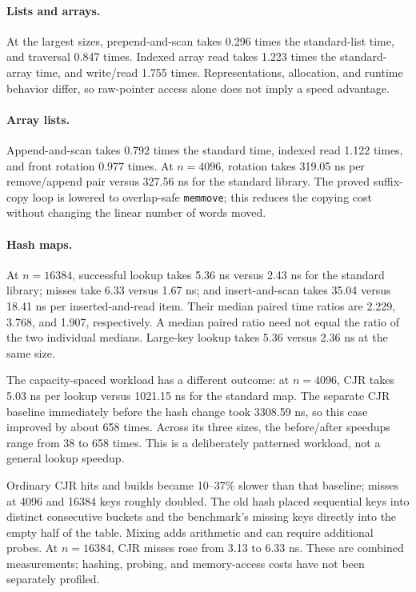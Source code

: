 \paragraph{Lists and arrays.} At the largest sizes, prepend-and-scan takes
0.296 times the standard-list time, and traversal 0.847 times.
Indexed array read takes 1.223 times the standard-array time, and
write/read 1.755 times. Representations, allocation, and runtime behavior
differ, so raw-pointer access alone does not imply a speed advantage.

\paragraph{Array lists.} Append-and-scan takes 0.792 times the standard
time, indexed read 1.122 times, and front rotation 0.977 times.
At $n=4096$, rotation takes 319.05 ns per remove/append pair versus
327.56 ns for the standard library. The proved suffix-copy loop is lowered
to overlap-safe \texttt{memmove}; this reduces the copying cost without
changing the linear number of words moved.

\paragraph{Hash maps.} At $n=16384$, successful lookup takes 5.36 ns
versus 2.43 ns for the standard library; misses take 6.33 versus 1.67 ns;
and insert-and-scan takes 35.04 versus 18.41 ns per inserted-and-read item.
Their median paired time ratios are 2.229, 3.768, and 1.907, respectively.
A median paired ratio need not equal the ratio of the two individual medians.
Large-key lookup takes 5.36 versus 2.36 ns at the same size.

The capacity-spaced workload has a different outcome: at $n=4096$, CJR
takes 5.03 ns per lookup versus 1021.15 ns for the standard map.
The separate CJR baseline immediately before the hash change took
3308.59 ns, so this case improved by about 658 times. Across its three
sizes, the before/after speedups range from 38 to 658 times.
This is a deliberately patterned workload, not a general lookup speedup.

Ordinary CJR hits and builds became 10--37\% slower than that baseline;
misses at 4096 and 16384 keys roughly doubled. The old hash placed
sequential keys into distinct consecutive buckets and the benchmark's
missing keys directly into the empty half of the table. Mixing adds
arithmetic and can require additional probes. At $n=16384$, CJR misses
rose from 3.13 to 6.33 ns. These are combined measurements; hashing,
probing, and memory-access costs have not been separately profiled.

